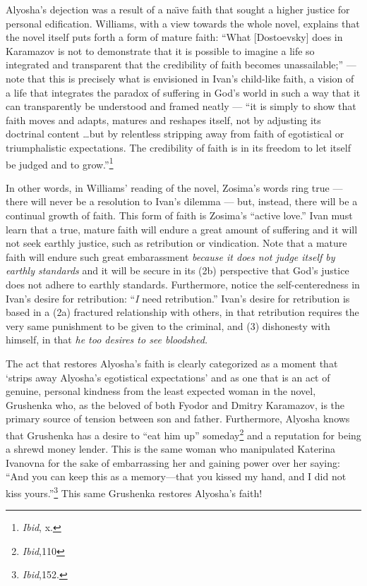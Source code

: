 Alyosha's dejection was a result of a na\"{\i}ve faith that sought a higher justice for personal edification. Williams, with a view towards the whole novel, explains that the novel itself puts forth a form of mature faith:
``What [Dostoevsky] does in Karamazov is not to demonstrate that it is possible to imagine a life so integrated and transparent that the credibility of faith becomes unassailable;'' --- note that this is precisely what is envisioned in Ivan's child-like faith, a vision of a life that integrates the paradox of suffering in God's world in such a way that it can transparently be understood and framed neatly --- ``it is simply to show that faith moves and adapts, matures and reshapes itself, not by adjusting its doctrinal content \ldots but by relentless stripping away from faith of egotistical or triumphalistic expectations. The credibility of faith is in its freedom to let itself be judged and to grow.''\footnote{\emph{Ibid}, x.}

In other words, in Williams' reading of the novel, Zosima's words ring true --- there will never be a resolution to Ivan's dilemma --- but, instead, there will be a continual growth of faith. This form of faith is Zosima's ``active love.'' Ivan must learn that a true, mature faith will endure a great amount of suffering and it will not seek earthly justice, such as retribution or vindication. Note that a mature faith will endure such great embarassment \emph{because it does not judge itself by earthly standards} and it will be secure in its (2b) perspective that God's justice does not adhere to earthly standards. Furthermore, notice the self-centeredness in Ivan's desire for retribution: ``\emph{I} need retribution.'' Ivan's desire for retribution is based in a (2a) fractured relationship with others, in that retribution requires the very same punishment to be given to the criminal, and (3) dishonesty with himself, in that \emph{he too desires to see bloodshed.} 

The act that restores Alyosha's faith is clearly categorized as a moment that `strips away Alyosha's egotistical expectations' and as one that is an act of genuine, personal kindness from the least expected woman in the novel, Grushenka who, as the beloved of both Fyodor and Dmitry Karamazov, is the primary source of tension between son and father. Furthermore, Alyosha knows that Grushenka has a desire to ``eat him up'' someday\footnote{\emph{Ibid},110} and a reputation for being a shrewd money lender. This is the same woman who manipulated Katerina Ivanovna for the sake of embarrassing her and gaining power over her saying: ``And you can keep this as a memory---that you kissed my hand, and I did not kiss yours.''\footnote{\emph{Ibid},152.} This same Grushenka restores Alyosha's faith!

